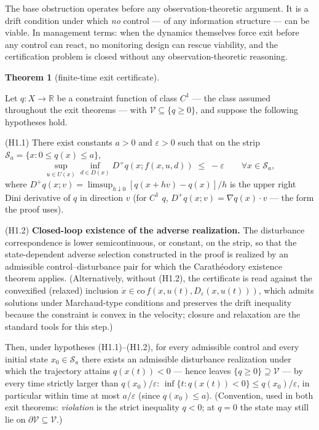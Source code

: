 \documentclass[11pt]{article}
\theoremstyle{definition}
\newtheorem{theorem}{Theorem}
\begin{document}
The base obstruction operates before any observation-theoretic argument.
It is a drift condition under which \emph{no} control --- of any
information structure --- can be viable. In management terms: when the
dynamics themselves force exit before any control can react, no
monitoring design can rescue viability, and the certification problem is
closed without any observation-theoretic reasoning.

\begin{theorem}[finite-time exit certificate]\label{thm:exit}

Let \(q : X \to \mathbb{R}\) be a constraint function of class \(C^1\) --- the class assumed throughout the exit theorems --- with
\(\mathcal{V} \subseteq \{ q \ge 0 \}\), and suppose the following
hypotheses hold.

(H1.1) There exist constants \(a > 0\) and \(\varepsilon > 0\) such that
on the strip \(\mathcal{S}_a = \{ x : 0 \le q(x) \le a \}\),
\[\sup_{u \in U(x)} \inf_{d \in D(x)} D^+ q(x; f(x,u,d)) \;\le\; -\varepsilon \qquad \forall x \in \mathcal{S}_a, \tag{1}\]
where \(D^+ q(x; v) = \limsup_{h \downarrow 0} [q(x + hv) - q(x)]/h\) is
the upper right Dini derivative of \(q\) in direction \(v\) (for \(C^1\)
\(q\), \(D^+ q(x; v) = \nabla q(x) \cdot v\) --- the form the proof
uses).

(H1.2) \textbf{Closed-loop existence of the adverse realization.} The
disturbance correspondence is lower semicontinuous, or constant, on the
strip, so that the state-dependent adverse selection constructed in the
proof is realized by an admissible control--disturbance pair for which
the Carath\'eodory existence theorem applies. (Alternatively, without (H1.2), the certificate is read against the convexified (relaxed) inclusion
\(\dot x \in \mathrm{co}\, f(x, u(t), D_{\varepsilon}(x, u(t)))\), which
admits solutions under Marchaud-type conditions and preserves the drift
inequality because the constraint is convex in the velocity; closure and
relaxation are the standard tools for this step.)

Then, under hypotheses (H1.1)--(H1.2), for every
admissible control and every initial state \(x_0 \in \mathcal{S}_a\)
there exists an admissible disturbance realization under which the
trajectory attains \(q(x(t)) < 0\) --- hence leaves
\(\{ q \ge 0 \} \supseteq \mathcal{V}\) --- by every time strictly
larger than \(q(x_0)/\varepsilon\):
\(\inf\{ t : q(x(t)) < 0 \} \le q(x_0)/\varepsilon\), in particular
within time at most \(a/\varepsilon\) (since \(q(x_0) \le a\)).
(Convention, used in both exit theorems: \emph{violation} is the strict
inequality \(q < 0\); at \(q = 0\) the state may still lie on
\(\partial \mathcal{V} \subseteq \mathcal{V}\).)

\end{theorem}
\end{document}
